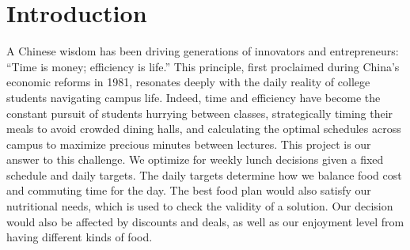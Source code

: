 \documentclass{article}
\begin{document}






\newpage
\tableofcontents

\newpage

\section{Introduction}
\label{sec:intro}
A Chinese wisdom has been driving generations of innovators and entrepreneurs: ``Time is money; efficiency is life.'' This principle, first proclaimed during China's economic reforms in 1981, resonates deeply with the daily reality of college students navigating campus life. Indeed, time and efficiency have become the constant pursuit of students hurrying between classes, strategically timing their meals to avoid crowded dining halls, and calculating the optimal schedules across campus to maximize precious minutes between lectures. This project is our answer to this challenge. We optimize for weekly lunch decisions given a fixed schedule and daily targets. The daily targets determine how we balance food cost and commuting time for the day. The best food plan would also satisfy our nutritional needs, which is used to check the validity of a solution. Our decision would also be affected by discounts and deals, as well as our enjoyment level from having different kinds of food.
\end{document}
